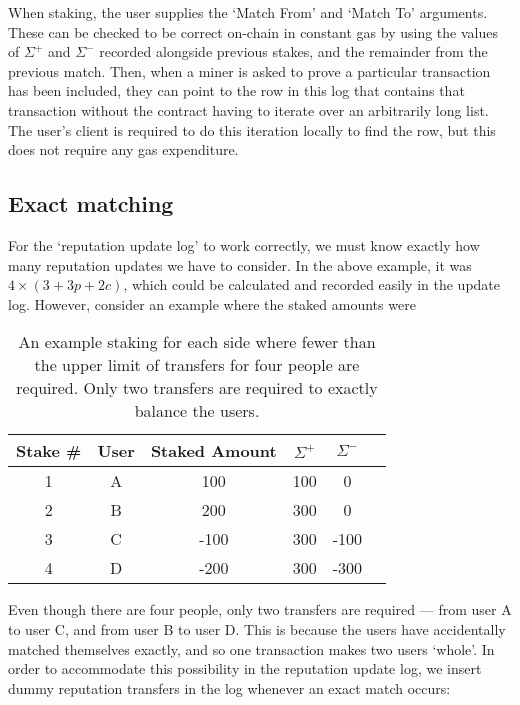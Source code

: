 When staking, the user supplies the `Match From' and `Match To' arguments. These can be checked to be correct on-chain in constant gas by using the values of $\Sigma^+$ and $\Sigma^-$ recorded alongside previous stakes, and the remainder from the previous match. Then, when a miner is asked to prove a particular transaction has been included, they can point to the row in this log that contains that transaction without the contract having to iterate over an arbitrarily long list. The user's client is required to do this iteration locally to find the row, but this does not require any gas expenditure.

\subsection{Exact matching}\label{sec:exactMatching}

For the `reputation update log' to work correctly, we must know exactly how many reputation updates we have to consider. In the above example, it was $4\times(3+3p+2c)$, which could be calculated and recorded easily in the update log. However, consider an example where the staked amounts were

\begin{table}[ht]
\centering
\caption{An example staking for each side where fewer than the upper limit of transfers for four people are required. Only two transfers are required to exactly balance the users.}
\begin{tabular}{|c|c|c|c|c|c|}
\hline
Stake \# & User  & Staked Amount & $\Sigma^+$ & $\Sigma^-$ \\ \hline
1 & A & 100           & 100                      & 0                                                                       \\ \hline
2 & B & 200           & 300                      & 0                                                                       \\ \hline
3 & C & -100           & 300                      & -100                                                                       \\ \hline
4 & D & -200          & 300                      & -300                                                                    \\ \hline
\end{tabular}
\end{table}

Even though there are four people, only two transfers are required --- from user A to user C, and from user B to user D. This is because the users have accidentally matched themselves exactly, and so one transaction makes two users `whole'. In order to accommodate this possibility in the reputation update log, we insert dummy reputation transfers in the log whenever an exact match occurs:

